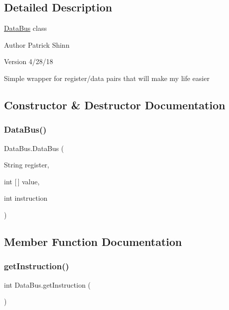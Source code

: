 \subsection{Detailed Description}
\mbox{\hyperlink{class_data_bus}{Data\+Bus}} class

\begin{DoxyAuthor}{Author}
Patrick Shinn 
\end{DoxyAuthor}
\begin{DoxyVersion}{Version}
4/28/18
\end{DoxyVersion}
Simple wrapper for register/data pairs that will make my life easier 

\subsection{Constructor \& Destructor Documentation}
\mbox{\label{class_data_bus_a0cc70dfa4640ba5fd075b6c6ecb58136}} 
\subsubsection{\texorpdfstring{Data\+Bus()}{DataBus()}}
{\footnotesize\ttfamily Data\+Bus.\+Data\+Bus (\begin{DoxyParamCaption}\item[{String}]{register,  }\item[{int \mbox{[}$\,$\mbox{]}}]{value,  }\item[{int}]{instruction }\end{DoxyParamCaption})\hspace{0.3cm}{\ttfamily [package]}}



\subsection{Member Function Documentation}
\mbox{\label{class_data_bus_a17ed7bfb3af6a205aa9b0ce056ff0616}} 
\subsubsection{\texorpdfstring{get\+Instruction()}{getInstruction()}}
{\footnotesize\ttfamily int Data\+Bus.\+get\+Instruction (\begin{DoxyParamCaption}{ }\end{DoxyParamCaption})\hspace{0.3cm}{\ttfamily [package]}}

